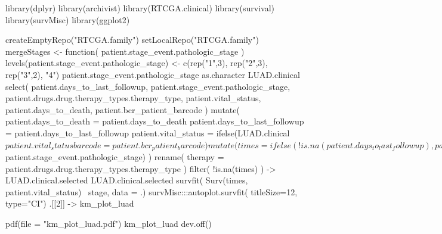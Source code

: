 \begin{Schunk}
\begin{Sinput}
library(dplyr)
library(archivist)
library(RTCGA.clinical)
library(survival)
library(survMisc)
library(ggplot2)

createEmptyRepo("RTCGA.family")
setLocalRepo("RTCGA.family")
mergeStages <- function( patient.stage_event.pathologic_stage ){
   levels(patient.stage_event.pathologic_stage) <- c(rep("1",3), rep("2",3), 
                                                     rep("3",2), "4")
   patient.stage_event.pathologic_stage %
      as.character %
}
LUAD.clinical %
   select(  patient.days_to_last_followup,
            patient.stage_event.pathologic_stage,
            patient.drugs.drug.therapy_types.therapy_type,
            patient.vital_status,
            patient.days_to_death,
            patient.bcr_patient_barcode
   ) %
   mutate(
      patient.days_to_death = patient.days_to_death%
      patient.days_to_last_followup = patient.days_to_last_followup%
      patient.vital_status = ifelse(LUAD.clinical$patient.vital_status %
      barcode = patient.bcr_patient_barcode %
   ) %
   mutate(
      times = ifelse( !is.na(patient.days_to_last_followup),
                 patient.days_to_last_followup,
                 patient.days_to_death),
      stage = mergeStages(LUAD.clinical$patient.stage_event.pathologic_stage)
   ) %
   rename(
      therapy = patient.drugs.drug.therapy_types.therapy_type
   ) %
   filter( !is.na(times) ) -> LUAD.clinical.selected 
   LUAD.clinical.selected %
   survfit( Surv(times, patient.vital_status)~ stage, data = .) %
   survMisc:::autoplot.survfit( titleSize=12, type="CI") %
   .[[2]] -> km_plot_luad

   pdf(file = "km_plot_luad.pdf")
   km_plot_luad
   dev.off()
\end{Sinput}
\end{Schunk}

